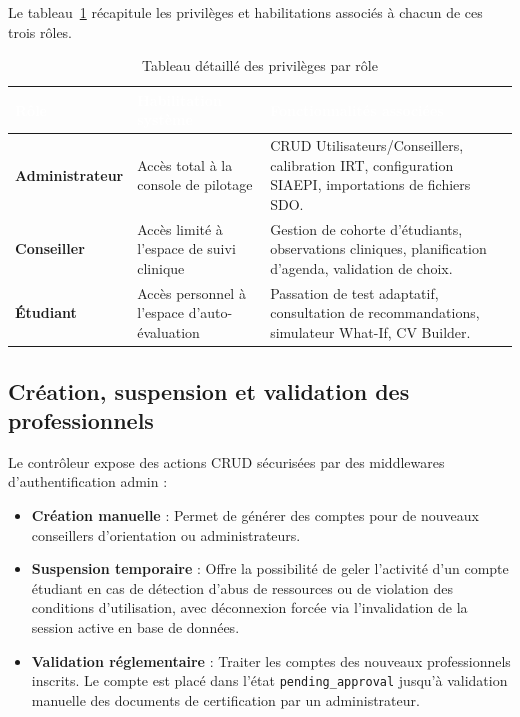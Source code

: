 Le tableau~\ref{tab:rbac_details} récapitule les privilèges et habilitations associés à chacun de ces trois rôles.

\begin{table}[H]
\centering
\small
\begin{tabular}{|p{3cm}|p{4.5cm}|p{7.5cm}|}
\hline
\rowcolor{headercolor} 
\textcolor{white}{\textbf{Rôle}} & \textcolor{white}{\textbf{Habilitation système}} & \textcolor{white}{\textbf{Fonctionnalités associées}} \\
\hline
\textbf{Administrateur} & Accès total à la console de pilotage & CRUD Utilisateurs/Conseillers, calibration IRT, configuration SIAEPI, importations de fichiers SDO. \\
\hline
\rowcolor{rowgray}
\textbf{Conseiller} & Accès limité à l'espace de suivi clinique & Gestion de cohorte d'étudiants, observations cliniques, planification d'agenda, validation de choix. \\
\hline
\textbf{Étudiant} & Accès personnel à l'espace d'auto-évaluation & Passation de test adaptatif, consultation de recommandations, simulateur What-If, CV Builder. \\
\hline
\end{tabular}
\caption{Tableau détaillé des privilèges par rôle}
\label{tab:rbac_details}
\end{table}

\subsection{Création, suspension et validation des professionnels}

Le contrôleur expose des actions CRUD sécurisées par des middlewares d'authentification admin :
\begin{itemize}
    \item \textbf{Création manuelle} : Permet de générer des comptes pour de nouveaux conseillers d'orientation ou administrateurs.
    \item \textbf{Suspension temporaire} : Offre la possibilité de geler l'activité d'un compte étudiant en cas de détection d'abus de ressources ou de violation des conditions d'utilisation, avec déconnexion forcée via l'invalidation de la session active en base de données.
    \item \textbf{Validation réglementaire} : Traiter les comptes des nouveaux professionnels inscrits. Le compte est placé dans l'état \texttt{pending\_approval} jusqu'à validation manuelle des documents de certification par un administrateur.
\end{itemize}

